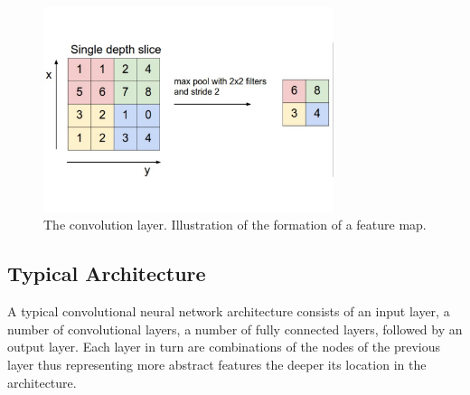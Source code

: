 \begin{figure}
\centering
\includegraphics[trim=0cm 0cm 0cm 0cm, clip=true, height=60mm]{Chapter1/pooling.pdf}
\caption{The convolution layer. Illustration of the formation of a feature map.}
\end{figure}

\subsection{Typical Architecture}

A typical convolutional neural network architecture consists of an input layer, a number of convolutional layers, a number of fully connected layers, followed by an output layer. Each layer in turn are combinations of the nodes of the previous layer thus representing more abstract features the deeper its location in the architecture.



